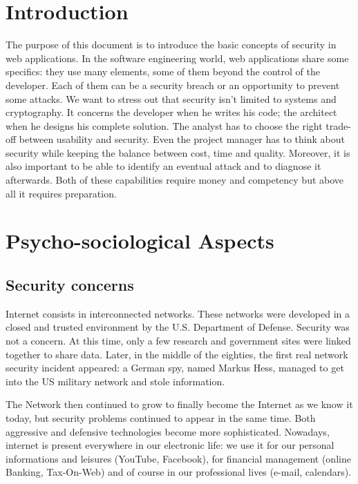 
\section{Introduction}

The purpose of this document is to introduce the basic concepts of
security in web applications. In the software engineering world, web
applications share some specifics: they use many elements, some of them
beyond the control of the developer. Each of them can be a security
breach or an opportunity to prevent some attacks. We want to stress
out that security isn't limited to systems and cryptography. It
concerns the developer when he writes his code; the architect when he
designs his complete solution. The analyst has to choose
the right trade-off between usability and security. Even the project
manager has to think about security while keeping the balance between
cost, time and quality. Moreover, it is also important to be able to
identify an eventual attack and to diagnose it afterwards. Both of
these capabilities require money and competency but above all it
requires preparation.

\section{Psycho-sociological Aspects}

\subsection{Security concerns}

Internet consists in interconnected networks. These networks were developed in
a closed and trusted environment by the U.S. Department of Defense.
Security was not a concern. At this time, only a few research and government
sites were linked together to share data. Later, in the middle of the
eighties, the first real network security incident appeared: a German
spy, named Markus Hess, managed to get into the US military network and
stole information.

The Network then continued to grow to finally become the Internet as we know
it today, but security problems continued to appear in the same time. Both
aggressive and defensive technologies become more sophisticated.
Nowadays, internet is present everywhere in our electronic life: we use it
for our personal informations and leisures (YouTube, Facebook), for financial
management (online Banking, Tax-On-Web) and of course in our professional
lives (e-mail, calendars).

